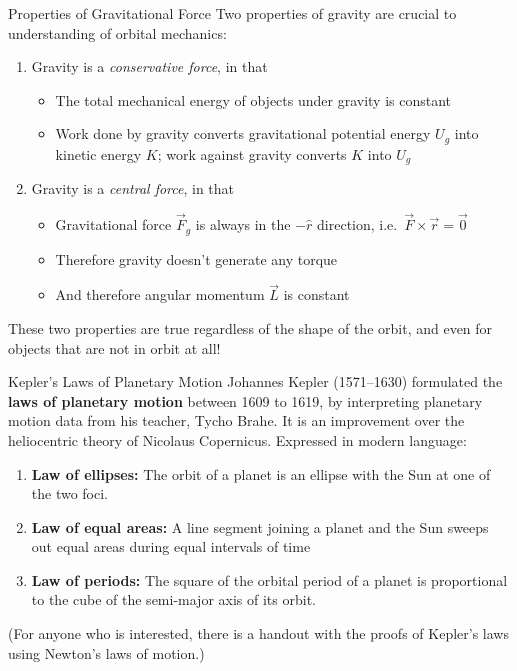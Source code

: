 \documentclass[12pt,compress,aspectratio=169]{beamer}
\begin{document}
\begin{frame}{Properties of Gravitational Force}
  Two properties of gravity are crucial to understanding of orbital mechanics:
  \begin{enumerate}
  \item Gravity is a \emph{conservative force}, in that
    \begin{itemize}
    \item The total mechanical energy of objects under gravity is constant
    \item Work done by gravity converts gravitational potential energy $U_g$
      into kinetic energy $K$; work against gravity converts $K$ into $U_g$
    \end{itemize}
  \item Gravity is a \emph{central force}, in that
    \begin{itemize}
    \item Gravitational force $\vec F_g$ is always in the $-\hat r$ direction,
      i.e.\ $\vec F\times\vec r=\vec 0$
    \item Therefore gravity doesn't generate any torque
    \item And therefore angular momentum $\vec L$ is constant
    \end{itemize}
  \end{enumerate}
  These two properties are true regardless of the shape of the orbit, and even
  for objects that are not in orbit at all!
\end{frame}


\begin{frame}{Kepler's Laws of Planetary Motion}
  Johannes Kepler (1571--1630) formulated the \textbf{laws of planetary motion}
  between 1609 to 1619, by interpreting planetary motion data from his teacher,
  Tycho Brahe. It is an improvement over the heliocentric theory of Nicolaus
  Copernicus. Expressed in modern language:
  \begin{enumerate}
  \item\textbf{Law of ellipses:} The orbit of a planet is an ellipse with the
    Sun at one of the two foci.
  \item\textbf{Law of equal areas:} A line segment joining a planet and the Sun
    sweeps out equal areas during equal intervals of time
  \item \textbf{Law of periods:} The square of the orbital period of a planet
    is proportional to the cube of the semi-major axis of its orbit.
  \end{enumerate}
  (For anyone who is interested, there is a handout with the proofs of Kepler's
  laws using Newton's laws of motion.)
\end{frame}
\end{document}
